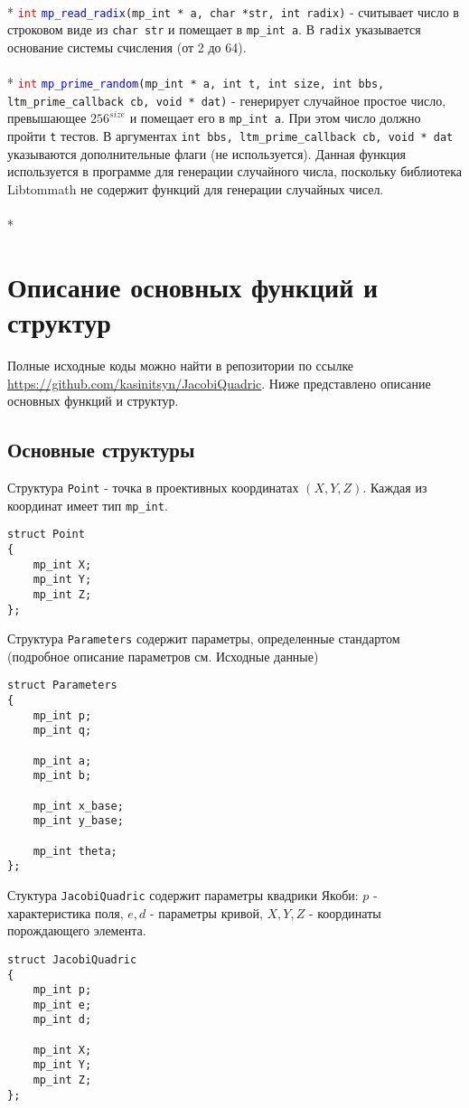 \documentclass[12pt]{article}
\begin{document}
\\*
\textcolor{red}{\texttt{int}} \textcolor{blue}{\texttt{mp\_read\_radix}}\texttt{(mp\_int * a, char *str, int radix)} - считывает число в строковом виде из \texttt{char str} и помещает в \texttt{mp\_int a}. В \texttt{radix} указывается основание системы счисления (от 2 до 64).\\
\\*
\textcolor{red}{\texttt{int}} \textcolor{blue}{\texttt{mp\_prime\_random}}\texttt{(mp\_int * a, int t, int size, int bbs, ltm\_prime\_callback cb, void * dat)} - генерирует случайное простое число, превышающее $256^{size}$ и помещает его в \texttt{mp\_int a}. При этом число должно пройти \texttt{t} тестов. В аргументах \texttt{int bbs, ltm\_prime\_callback cb, void * dat} указываются дополнительные флаги (не используется). Данная функция используется в программе для генерации случайного числа, поскольку библиотека Libtommath не содержит функций для генерации случайных чисел.\\ 
\\*


\section{Описание основных функций и структур}
Полные исходные коды можно найти в репозитории по ссылке \url{https://github.com/kasinitsyn/JacobiQuadric}. Ниже представлено описание основных функций и структур.
\subsection{Основные структуры}
Структура \texttt{Point} - точка в проективных координатах $(X, Y, Z)$. Каждая из координат имеет тип \texttt{mp\_int}.
\lstset{language=C}
\begin{lstlisting} 
struct Point
{
    mp_int X;
    mp_int Y;
    mp_int Z;
};
\end{lstlisting}
Структура \texttt{Parameters} содержит параметры, определенные стандартом (подробное описание параметров см. Исходные данные)
\lstset{language=C}
\begin{lstlisting} 
struct Parameters
{
    mp_int p;
    mp_int q;

    mp_int a;
    mp_int b;

    mp_int x_base;
    mp_int y_base;

    mp_int theta;
};
\end{lstlisting}
Стуктура \texttt{JacobiQuadric} содержит параметры квадрики Якоби: $p$ - характеристика поля, $e, d$ - параметры кривой, $X, Y, Z$ - координаты порождающего элемента.
\lstset{language=C}
\begin{lstlisting} 
struct JacobiQuadric
{
    mp_int p;
    mp_int e;
    mp_int d;

    mp_int X;
    mp_int Y;
    mp_int Z;
};
\end{lstlisting} 
\end{document}
